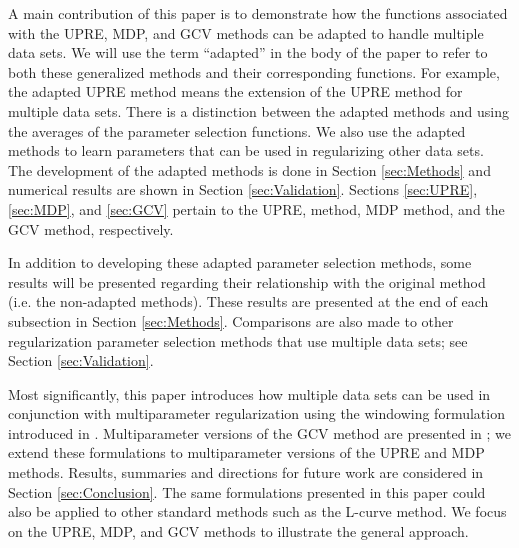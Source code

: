 \documentclass[12pt]{article}
\begin{document}
A main contribution of this paper is to demonstrate how the functions associated with the UPRE, MDP, and GCV methods can be adapted to handle multiple data sets. We will use the term ``adapted'' in the body of the paper to refer to both these generalized methods and their corresponding functions. For example, the adapted UPRE method means the extension of the UPRE method for multiple data sets. There is a distinction between the adapted methods and using the averages of the parameter selection functions. We also use the adapted methods to learn parameters that can be used in regularizing other data sets. The development of the adapted methods is done in Section \ref{sec:Methods} and numerical results are shown in Section \ref{sec:Validation}. Sections \ref{sec:UPRE}, \ref{sec:MDP}, and \ref{sec:GCV} pertain to the UPRE, method, MDP method, and the GCV method, respectively.  \par 
In addition to developing these adapted parameter selection methods, some results will be presented regarding their relationship with the original method (i.e. the non-adapted methods). These results are presented at the end of each subsection in Section \ref{sec:Methods}. Comparisons are also made to other regularization parameter selection methods that use multiple data sets; see Section \ref{sec:Validation}. \par
Most significantly, this paper introduces how multiple data sets can be used in conjunction with multiparameter regularization using the windowing formulation introduced in \cite{ChungEasleyOLeary}. Multiparameter versions of the GCV method are presented in \cite{ChungEasleyOLeary,ModarresiGolub2}; we extend these formulations to multiparameter versions of the UPRE and MDP methods. Results, summaries and directions for future work are considered in Section \ref{sec:Conclusion}. The same formulations presented in this paper could also be applied to other standard methods such as the L-curve method. We focus on the UPRE, MDP, and GCV methods to illustrate the general approach.
\end{document}
